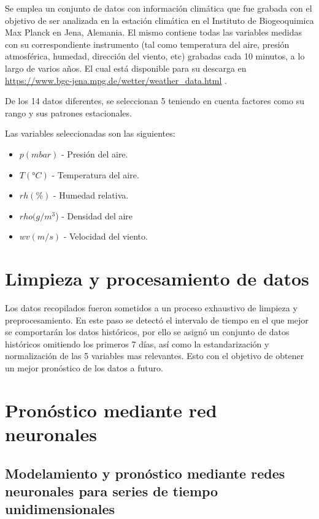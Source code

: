 \documentclass[
  us-letterpaper,
]{scrreprt}
\theoremstyle{plain}
\theoremstyle{definition}
\theoremstyle{definition}
\theoremstyle{remark}
\begin{document}
Se emplea un conjunto de datos con información climática que fue grabada
con el objetivo de ser analizada en la estación climática en el
Instituto de Biogeoquimica Max Planck en Jena, Alemania. El mismo
contiene todas las variables medidas con su correspondiente instrumento
(tal como temperatura del aire, presión atmosférica, humedad, dirección
del viento, etc) grabadas cada 10 minutos, a lo largo de varios años. El
cual está disponible para su descarga en
\url{https://www.bgc-jena.mpg.de/wetter/weather_data.html} .

De los 14 datos diferentes, se seleccionan 5 teniendo en cuenta factores
como su rango y sus patrones estacionales.

Las variables seleccionadas son las siguientes:

\begin{itemize}
\item
  \(p( mbar )\) - Presión del aire.
\item
  \(T( ° C )\) - Temperatura del aire.
\item
  \(rh( \% )\) - Humedad relativa.
\item
  \(rho(g/m^3\)) - Densidad del aire
\item
  \(wv(m/s)\) - Velocidad del viento.
\end{itemize}

\section{Limpieza y procesamiento de
datos}\label{limpieza-y-procesamiento-de-datos}

Los datos recopilados fueron sometidos a un proceso exhaustivo de
limpieza y preprocesamiento. En este paso se detectó el intervalo de
tiempo en el que mejor se comportarán los datos históricos, por ello se
asignó un conjunto de datos históricos omitiendo los primeros 7 días,
así como la estandarización y normalización de las 5 variables mas
relevantes. Esto con el objetivo de obtener un mejor pronóstico de los
datos a futuro.

\section{Pronóstico mediante red
neuronales}\label{pronuxf3stico-mediante-red-neuronales}

\subsection{Modelamiento y pronóstico mediante redes neuronales para
series de tiempo
unidimensionales}\label{modelamiento-y-pronuxf3stico-mediante-redes-neuronales-para-series-de-tiempo-unidimensionales}
\end{document}
